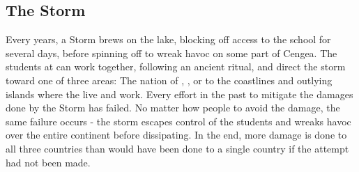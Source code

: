 \documentclass[blue]{GL2020}
\begin{document}
\subsection*{The Storm}
Every \pCycle{} years, a Storm brews on the lake, blocking off access to the school for several days, before spinning off to wreak havoc on some part of Cengea. The students at \pSchool{} can work together, following an ancient ritual, and direct the storm toward one of three areas: The nation of \pFarm{}, \pTech{}, or to the coastlines and outlying islands where the \pShippies{} live and work. Every effort in the past to mitigate the damages done by the Storm has failed. No matter how people to avoid the damage, the same failure occurs - the storm escapes control of the students and wreaks havoc over the entire continent before dissipating. In the end, more damage is done to all three countries than would have been done to a single country if the attempt had not been made. 
\end{document}
